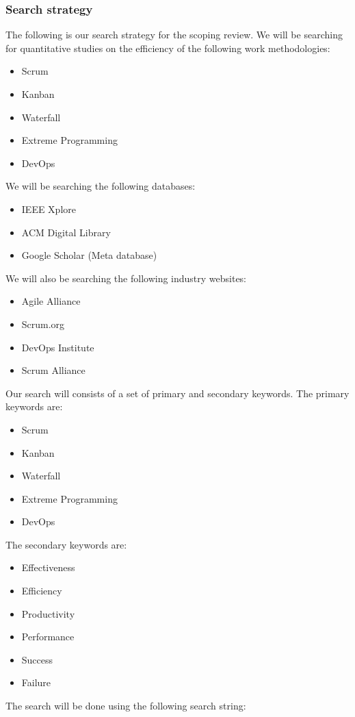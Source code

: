 \documentclass[12pt]{article}
\begin{document}
\subsubsection{Search strategy}
The following is our search strategy for the scoping review.
We will be searching for quantitative studies on the efficiency of the following work methodologies:
\begin{itemize}
  \item Scrum
  \item Kanban
  \item Waterfall
  \item Extreme Programming
  \item DevOps
\end{itemize}
We will be searching the following databases:
\begin{itemize}
  \item IEEE Xplore \cite{IEEEXplore}
  \item ACM Digital Library \cite{ACMDigitalLibrary}
  \item Google Scholar \cite{GoogleScholar} (Meta database)
\end{itemize}
We will also be searching the following industry websites:
\begin{itemize}
  \item Agile Alliance \cite{AgileAlliance2015}
  \item Scrum.org \cite{HomeScrumorg}
  \item DevOps Institute \cite{Organisations}
  \item Scrum Alliance \cite{ScrumAllianceFind}
\end{itemize}
Our search will consists of a set of primary and secondary keywords.
The primary keywords are:
\begin{itemize}
  \item Scrum
  \item Kanban
  \item Waterfall
  \item Extreme Programming
  \item DevOps
\end{itemize}
The secondary keywords are:
\begin{itemize}
  \item Effectiveness
  \item Efficiency
  \item Productivity
  \item Performance
  \item Success
  \item Failure
\end{itemize}
The search will be done using the following search string:
\end{document}
